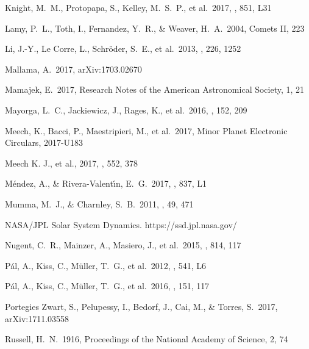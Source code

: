 \documentclass[a4paper,fleqn,usenatbib]{mnras}
\begin{document}
\begin{thebibliography}{99}
 Knight, M.~M., Protopapa, S., Kelley, M.~S.~P., et al.\ 2017, \apjl, 851, L31 

 Lamy, P.~L., Toth, I., Fernandez, Y.~R., \& Weaver, H.~A.\ 2004, Comets II, 223 

 Li, J.-Y., Le Corre, L., Schr{\"o}der, S.~E., et al.\ 2013, \icarus, 226, 1252 

 Mallama, A.\ 2017, arXiv:1703.02670 

 Mamajek, E.\ 2017, Research Notes of the American Astronomical Society, 1, 21 

 Mayorga, L.~C., Jackiewicz, J., Rages, K., et al.\ 2016, \aj, 152, 209 

 Meech, K., Bacci, P., Maestripieri, M., et al.\ 2017, Minor Planet Electronic Circulars, 2017-U183

 Meech K. J., et al., 2017, \nat, 552, 378

 M{\'e}ndez, A., \& Rivera-Valent{\'{\i}}n, E.~G.\ 2017, \apjl, 837, L1 

 Mumma, M.~J., \& Charnley, S.~B.\ 2011, \araa, 49, 471 

 NASA/JPL Solar System Dynamics. https://ssd.jpl.nasa.gov/

 Nugent, C.~R., Mainzer, A., Masiero, J., et al.\ 2015, \apj, 814, 117 

 P{\'a}l, A., Kiss, C., M{\"u}ller, T.~G., et al.\ 2012, \aap, 541, L6 

 P{\'a}l, A., Kiss, C., M{\"u}ller, T.~G., et al.\ 2016, \aj, 151, 117 

 Portegies Zwart, S., Pelupessy, I., Bedorf, J., Cai, M., \& Torres, S.\ 2017, arXiv:1711.03558

 Russell, H.~N.\ 1916, Proceedings of the National Academy of Science, 2, 74 


\end{thebibliography}
\end{document}
